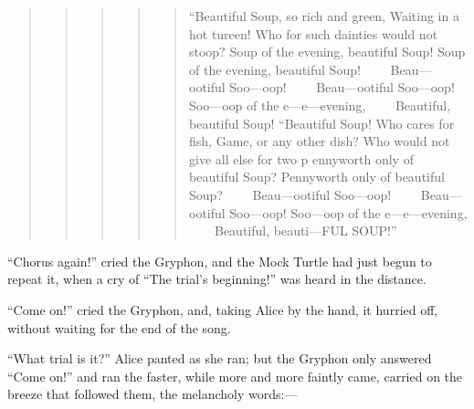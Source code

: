 \documentclass[11pt,openany,oneside]{book}
\begin{document}
\begin{quote}
\begin{quote}
\begin{quote}
\begin{quote}
\begin{quote}
{\small “Beautiful Soup, so rich and green,}\newline
{\small  Waiting in a hot tureen!}\newline
{\small  Who for such dainties would not stoop?}\newline
{\small  Soup of the evening, beautiful Soup!}\newline
{\small  Soup of the evening, beautiful Soup!}\newline
{\small  ~~~~Beau—ootiful Soo—oop!}\newline
{\small  ~~~~Beau—ootiful Soo—oop!}\newline
{\small  Soo—oop of the e—e—evening,}\newline
{\small  ~~~~Beautiful, beautiful Soup!}\newline
{\small  }\newline
{\small  “Beautiful Soup! Who cares for fish,}\newline
{\small  Game, or any other dish?}\newline
{\small  Who would not give all else for two p}\newline
{\small  ennyworth only of beautiful Soup?}\newline
{\small  Pennyworth only of beautiful Soup?}\newline
{\small  ~~~~Beau—ootiful Soo—oop!}\newline
{\small  ~~~~Beau—ootiful Soo—oop!}\newline
{\small  Soo—oop of the e—e—evening,}\newline
{\small  ~~~~Beautiful, beauti—FUL SOUP!” }

\end{quote}
\end{quote}
\end{quote}
\end{quote}
\end{quote}
“Chorus again!” cried the Gryphon, and the Mock Turtle had just begun to repeat it, when a cry of “The trial’s beginning!” was heard in the distance. 

“Come on!” cried the Gryphon, and, taking Alice by the hand, it hurried off, without waiting for the end of the song. 

“What trial is it?” Alice panted as she ran; but the Gryphon only answered “Come on!” and ran the faster, while more and more faintly came, carried on the breeze that followed them, the melancholy words:— 
\end{document}
